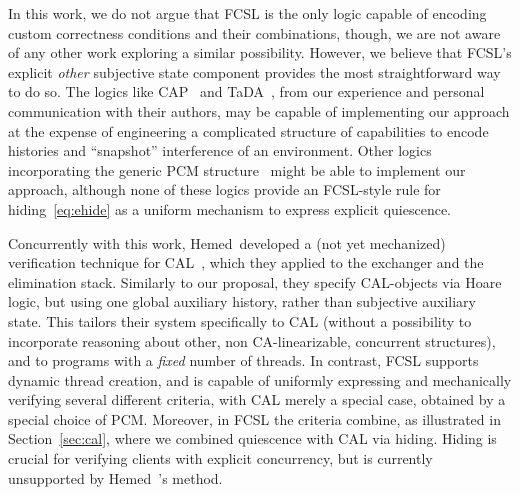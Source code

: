 In this work, we do not argue that FCSL is the only logic capable of
encoding custom correctness conditions and their combinations, though,
we are not aware of any other work exploring a similar possibility.
%
However, we believe that FCSL's explicit \emph{other}
subjective state component provides the most straightforward way to do
so.
%
The logics like CAP~\cite{DinsdaleYoung-al:ECOOP10} and
TaDA~\cite{ArrozPincho-al:ECOOP14}, from our experience and personal
communication with their authors, may be capable of implementing our
approach at the expense of engineering a complicated structure of
capabilities to encode histories and ``snapshot'' interference of an
environment.
%
Other logics incorporating the generic PCM
structure~\cite{Raad-al:ESOP15,Jung-al:POPL15,Jung-al:ICFP16,Turon-al:OOPSLA14}
might be able to implement our approach, although none of these logics
provide an FCSL-style rule for hiding~\eqref{eq:ehide} as a uniform
mechanism to express explicit quiescence.


Concurrently with this work, Hemed~\etal developed a (not yet
mechanized) verification technique for CAL~\cite{Hemed-al:DISC15},
which they applied to the exchanger and the elimination
stack. Similarly to our proposal, they specify CAL-objects via Hoare
logic, but using one global auxiliary history, rather than subjective
auxiliary state. 
%
This tailors their system specifically to CAL (without a possibility
to incorporate reasoning about other, non CA-linearizable, concurrent
structures), and to programs with a \emph{fixed} number of threads. In
contrast, FCSL supports dynamic thread creation, and is capable of
uniformly expressing and mechanically verifying several different
criteria, with CAL merely a special case, obtained by a special choice
of PCM. Moreover, in FCSL the criteria combine, as illustrated in
Section~\ref{sec:cal}, where we combined quiescence with CAL via
hiding. Hiding is crucial for verifying clients with explicit
concurrency, but is currently unsupported by Hemed~\etal's method.
%

